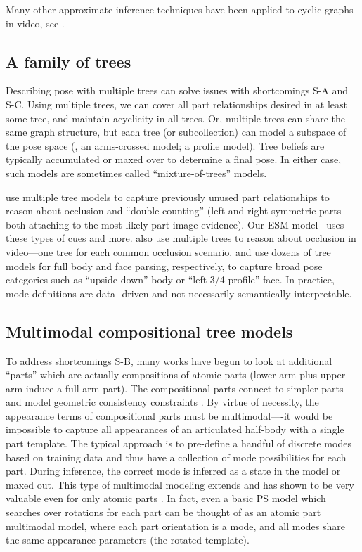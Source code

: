 Many other approximate inference techniques have been applied to cyclic graphs 
in video, see .

\subsection{A family of trees}\label{sec:tree-fam}
Describing pose with multiple trees can solve issues with shortcomings S-A and 
S-C.   Using multiple trees, we can cover all part relationships desired in at 
least some tree, and maintain acyclicity in all trees.  Or, multiple trees can 
share the same graph structure, but each tree (or subcollection) can model a 
subspace of the pose space (\eg, an arms-crossed model; a profile model). Tree 
beliefs are typically accumulated or maxed over to determine a final pose.  In 
either case, such models are sometimes called ``mixture-of-trees'' models.
  
\citet{wang2008multiple} use multiple tree models to capture previously unused 
part relationships to reason about occlusion and ``double counting'' (left and 
right symmetric parts both attaching to the most likely part image evidence).  
Our ESM model~ uses these types of cues and more.  
\citet{ioffe2001} also use multiple trees to reason about occlusion in 
video---one tree for each common occlusion scenario.  \citet{everingham2011} 
and \citet{ramanan-faces} use dozens of tree models for full body and face 
parsing, respectively, to capture broad pose categories such as ``upside down'' 
body or ``left 3/4 profile'' face.  In practice, mode definitions are data- 
driven and not necessarily semantically interpretable.

\subsection{Multimodal compositional tree models}
To address shortcomings S-B, many works have begun to look at additional 
``parts'' which are actually compositions of atomic parts (\eg lower arm plus 
upper arm induce a full arm part).  The compositional parts connect to simpler 
parts and model geometric consistency constraints 
\citep{wang2011,sun2011,deva2011}.  By virtue of necessity, the appearance 
terms of compositional parts must be multimodal----it would be impossible to 
capture all appearances of an articulated half-body with a single part 
template.  The typical approach is to pre-define a handful of discrete modes 
based on training data and thus have a collection of mode possibilities for 
each part. During inference, the correct mode is inferred as a state in the 
model or maxed out.  This type of multimodal modeling extends and has shown to 
be very valuable even for only atomic parts \citep{deva2011}.  In fact, even a 
basic PS model which searches over rotations for each part can be thought of as 
an atomic part multimodal model, where each part orientation is a mode, and all 
modes share the same appearance parameters (the rotated template).

